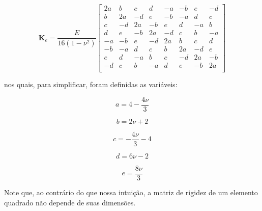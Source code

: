     \begin{equation}
        \mathbf{K}_e = 
        \frac{E}{16\left(1-\nu^2\right)}\begin{bmatrix}
            2a & b  & c  & d  & -a & -b & e  & -d\\
            b  & 2a & -d & e  & -b & -a & d  & c \\
            c  & -d & 2a & -b & e  & d  & -a & b \\
            d  & e  & -b & 2a & -d & c  & b  & -a\\
            -a & -b & e  & -d & 2a & b  & c  & d \\
            -b & -a & d  & c  & b  & 2a & -d & e \\
            e  & d  & -a & b  & c  & -d & 2a & -b\\
            -d & c  & b  & -a & d  & e  & -b & 2a\\
        \end{bmatrix}
    \end{equation} 
 
    \noindent nos quais, para simplificar, foram definidas as variáveis:

    \begin{equation*}
        a = 4 - \frac{4\nu}{3}
    \end{equation*}

    \begin{equation*}
        b = 2\nu + 2
    \end{equation*}

    \begin{equation*}
        c = -\frac{4\nu}{3} - 4
    \end{equation*}

    \begin{equation*}
        d = 6\nu - 2
    \end{equation*}
    
    \begin{equation*}
        e = \frac{8\nu}{3}
    \end{equation*}

    Note que, ao contrário do que nossa intuição, a matriz de rigidez de um elemento quadrado não depende de suas dimensões.